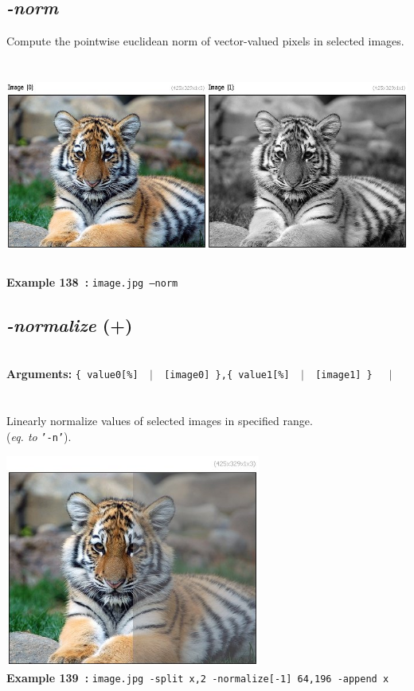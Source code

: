 \documentclass[a4paper,11pt,twoside]{book}
\begin{document}
\subsection{\emph{-norm} }\vspace*{-0.5em}
Compute the pointwise euclidean norm of vector-valued pixels in selected images.
\begin{center}\includegraphics[keepaspectratio=true,height=7cm,width=\textwidth]{img/gmic_def138.jpg}\\
{\footnotesize \textbf{Example 138~:} \texttt{image.jpg --norm}}
\end{center}

\subsection{\emph{-normalize} (+)}\vspace*{-0.5em}
~\\\textbf{Arguments: } 
{\small \texttt{\{ value0[\%] ~$|$~ [image0] \},\{ value1[\%] ~$|$~ [image1] \}}}~~~$|$\\
\hspace*{2.2cm}{\small \texttt{[image]}}\\~\\
Linearly normalize values of selected images in specified range.
~\\(\emph{eq. to} {\small \texttt{'-n'}}).
\begin{center}\includegraphics[keepaspectratio=true,height=7cm,width=\textwidth]{img/gmic_def139.jpg}\\
{\footnotesize \textbf{Example 139~:} \texttt{image.jpg -split x,2 -normalize[-1] 64,196 -append x}}
\end{center}
\end{document}
